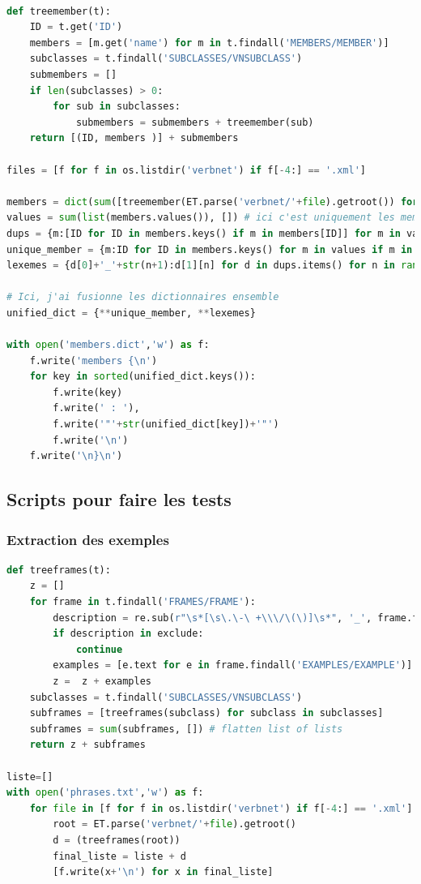 \begin{lstlisting}[language=Python, caption = code pour ajouter des lexèmes à lexicon.dict]

def treemember(t):
    ID = t.get('ID')
    members = [m.get('name') for m in t.findall('MEMBERS/MEMBER')]
    subclasses = t.findall('SUBCLASSES/VNSUBCLASS')
    submembers = []
    if len(subclasses) > 0:
        for sub in subclasses:
            submembers = submembers + treemember(sub)
    return [(ID, members )] + submembers

files = [f for f in os.listdir('verbnet') if f[-4:] == '.xml']

members = dict(sum([treemember(ET.parse('verbnet/'+file).getroot()) for file in files], [])) # ici on a classe : [membre,...]
values = sum(list(members.values()), []) # ici c'est uniquement les membres, sans infos sur leur classe
dups = {m:[ID for ID in members.keys() if m in members[ID]] for m in values if values.count(m)>1}
unique_member = {m:ID for ID in members.keys() for m in values if m in members[ID] and values.count(m)==1}
lexemes = {d[0]+'_'+str(n+1):d[1][n] for d in dups.items() for n in range(len(d[1]))}

# Ici, j'ai fusionne les dictionnaires ensemble
unified_dict = {**unique_member, **lexemes}

with open('members.dict','w') as f:
    f.write('members {\n')
    for key in sorted(unified_dict.keys()):
        f.write(key)
        f.write(' : '),
        f.write('"'+str(unified_dict[key])+'"')
        f.write('\n')
    f.write('\n}\n')

\end{lstlisting}


\subsection{Scripts pour faire les tests}

\subsubsection{Extraction des exemples}

\begin{lstlisting}[language=Python, caption = code pour créer phrases.txt]
def treeframes(t):
    z = []
    for frame in t.findall('FRAMES/FRAME'):
        description = re.sub(r"\s*[\s\.\-\ +\\\/\(\)]\s*", '_', frame.find('DESCRIPTION').get('primary'))
        if description in exclude:
            continue    
        examples = [e.text for e in frame.findall('EXAMPLES/EXAMPLE')]
        z =  z + examples 
    subclasses = t.findall('SUBCLASSES/VNSUBCLASS')
    subframes = [treeframes(subclass) for subclass in subclasses]
    subframes = sum(subframes, []) # flatten list of lists
    return z + subframes

liste=[]
with open('phrases.txt','w') as f:
    for file in [f for f in os.listdir('verbnet') if f[-4:] == '.xml']:
        root = ET.parse('verbnet/'+file).getroot()       
        d = (treeframes(root))
        final_liste = liste + d
        [f.write(x+'\n') for x in final_liste]

\end{lstlisting}

